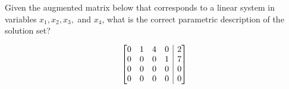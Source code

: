 \documentclass{ximera}
\makeatletter
\newenvironment{amatrix}[1]{%
	\left[\begin{array}{@{}*{#1}{c}|c@{}}
	}{%
\end{array}\right]
}
\makeatother
\begin{document}
  	
  	\begin{question}
  	Given the augmented matrix below that corresponds to a linear system in variables $x_1,x_2,x_3,$ and $x_4$, what is the correct parametric description of the solution set?
  		
  	$$\begin{amatrix}{4}
  	0&1&4&0&2\\
  	0&0&0&1&7\\
  	0&0&0&0&0\\
  	0&0&0&0&0
  	\end{amatrix}$$
  		
  		
  		\begin{multipleChoice}
  		\end{multipleChoice}
  		
  	\end{question}
  	
  
  
\end{document}
